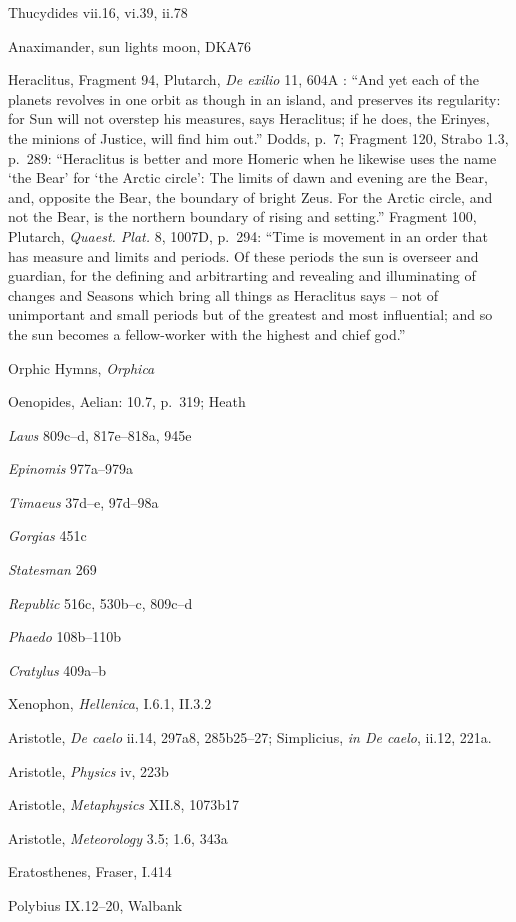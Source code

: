 \documentclass{amsart}
\theoremstyle{definition}
\begin{document}
Thucydides vii.16, vi.39, ii.78

Anaximander, sun lights moon, DKA76

Heraclitus, Fragment 94, Plutarch, {\em De exilio} 11, 604A \cite[p.~284]{heraclitus}: ``And yet each of the planets revolves in one orbit as though
in an island, and preserves its regularity: for Sun will not overstep his measures, says Heraclitus; if he does, the Erinyes, the minions of Justice, will
find him out.'' Dodds, p.~7;
Fragment 120, Strabo 1.3, p.~289: ``Heraclitus is better and more Homeric when he likewise uses the name `the Bear' for `the Arctic circle':
The limits of dawn and evening are the Bear, and, opposite the Bear, the boundary of bright Zeus. For the Arctic circle, and not
the Bear, is the northern boundary of rising and setting.''
Fragment 100, Plutarch, {\em Quaest. Plat.} 8, 1007D, p.~294: ``Time is movement in an order that has measure and limits
and periods. Of these periods the sun is overseer and guardian, for the 
defining and arbitrarting and revealing and illuminating of changes and Seasons which bring all things as Heraclitus says -- 
not of unimportant and small periods but of the greatest and most influential; and so the 
sun becomes a fellow-worker with the highest and chief god.''

Orphic Hymns, {\em Orphica}

Oenopides, Aelian: 10.7, p.~319; Heath \cite[p.~130]{aristarchus}

{\em Laws} 809c--d, 817e--818a, 945e

{\em Epinomis} 977a--979a

{\em Timaeus} 37d--e, 97d--98a

{\em Gorgias} 451c

{\em Statesman} 269

{\em Republic} 516c, 530b--c, 809c--d

{\em Phaedo} 108b--110b

{\em Cratylus} 409a--b

Xenophon, {\em Hellenica},  I.6.1, II.3.2

Aristotle, {\em De caelo} ii.14, 297a8, 285b25--27; Simplicius, {\em in De caelo}, ii.12, 221a.

Aristotle, {\em Physics} iv, 223b

Aristotle, {\em Metaphysics} XII.8, 1073b17

Aristotle, {\em Meteorology} 3.5; 1.6, 343a

Eratosthenes, Fraser, I.414

Polybius IX.12--20, Walbank \cite[p.~141]{walbankII}
\end{document}
